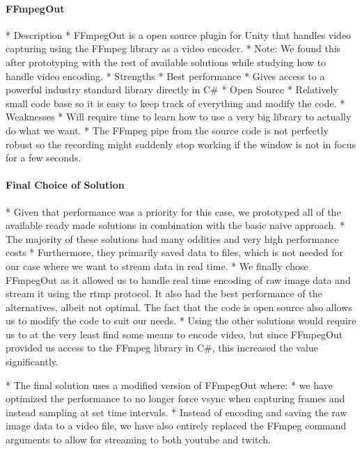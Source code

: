 \paragraph{FFmpegOut}
        * Description
            * FFmpegOut is a open source plugin for Unity that handles video capturing using the FFmpeg library as a video encoder. 
            * Note: We found this after prototyping with the rest of available solutions while studying how to handle video encoding. 
        * Strengths
            * Best performance
            * Gives access to a powerful industry standard library directly in C\#
            * Open Source
            * Relatively small code base so it is easy to keep track of everything and modify the code. 
        * Weaknesses
            * Will require time to learn how to use a very big library to actually do what we want. 
            * The FFmpeg pipe from the source code is not perfectly robust so the recording might suddenly stop working if the window is not in focus for a few seconds. 
\paragraph{Final Choice of Solution}
    * Given that performance was a priority for this case, we prototyped all of the available ready made solutions in combination with the basic naive approach.
    * The majority of these solutions had many oddities and very high performance costs
    * Furthermore, they primarily saved data to files, which is not needed for our case where we want to stream data in real time. 
    * We finally chose FFmpegOut as it allowed us to handle real time encoding of raw image data and stream it using the rtmp protocol. It also had the best performance of the alternatives, albeit not optimal. The fact that the code is open source also allows us to modify the code to suit our needs. 
    * Using the other solutions would require us to at the very least find some means to encode video, but since FFmpegOut provided us access to the FFmpeg library in C\#, this increased the value significantly. 
    
    * The final solution uses a modified version of FFmpegOut where: 
        * we have optimized the performance to no longer force vsync when capturing frames and instead sampling at set time intervals. 
        * Instead of encoding and saving the raw image data to a video file, we have also entirely replaced the FFmpeg command arguments to allow for streaming to both youtube and twitch. 
    

